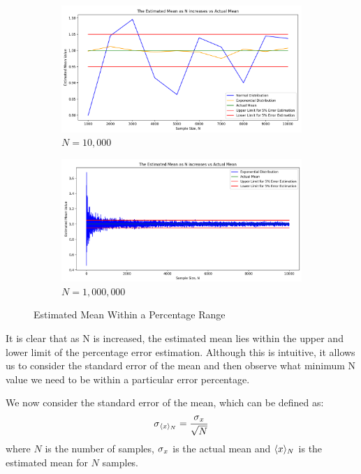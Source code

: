 \documentclass[12pt]{article}
\begin{document}
\begin{figure}[h]
\begin{subfigure}{0.5\textwidth}
\includegraphics[width=1\linewidth, left]{1,000 to 10,000 5 percent error.png} 
\caption{$N = 10,000$}
\label{fig:subim1}
\end{subfigure}
\begin{subfigure}{0.5\textwidth}
\includegraphics[width=1.03\linewidth]{Exponential N = 10,000.png}
\caption{$N = 1,000,000$}
\label{fig:subim2}
\end{subfigure}
\caption{Estimated Mean Within a Percentage Range}
\label{fig:image2}
\end{figure}

It is clear that as N is increased, the estimated mean lies within the upper and lower limit of the percentage error estimation. Although this is intuitive, it allows us to consider the standard error of the mean and then observe what minimum N value we need to be within a particular error percentage. 

We now consider the standard error of the mean, which can be defined as:
\begin{align}
\sigma\textsubscript{$\langle x\rangle$\textsubscript{$N$}}  = \frac{\sigma\textsubscript{$x$}}{\sqrt{N}}
\end{align}
where $N$ is the number of samples, $\sigma\textsubscript{$x$}$ is the actual mean and $\langle x\rangle\textsubscript{$N$}$ is the estimated mean for $N$ samples.
\end{document}
